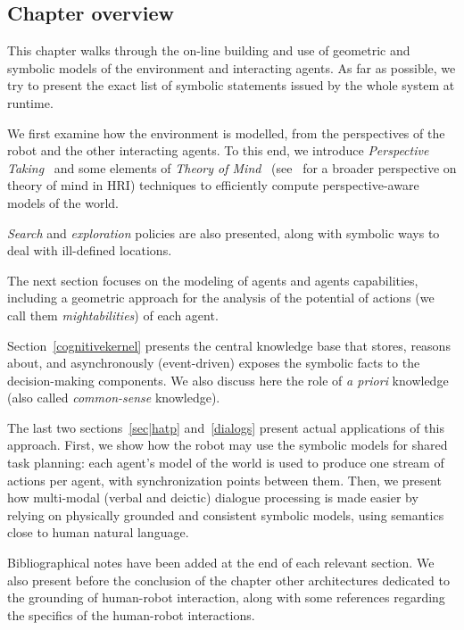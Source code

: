 \documentclass{svmult}
\begin{document}


\subsection{Chapter overview}

This chapter walks through the on-line building and use of geometric and
symbolic models of the environment and interacting agents. As far as possible,
we try to present the exact list of symbolic statements issued by the
whole system at runtime.

We first examine how the environment is modelled, from the perspectives of the
robot and the other interacting agents. To this end, we introduce
\emph{Perspective Taking}~\cite{Flavell1992,Tversky1999} and some elements of
\emph{Theory of Mind}~\cite{warnier2012when} (see~\cite{lemaignan2015mutual}
for a broader perspective on theory of mind in HRI) techniques to efficiently
compute perspective-aware models of the world. 

\emph{Search} and \emph{exploration} policies are also presented, along with
symbolic ways to deal with ill-defined locations.

The next section focuses on the modeling of agents and agents capabilities,
including a geometric approach for the analysis of the potential of actions (we
call them \emph{mightabilities}) of each agent.

Section~\ref{cognitivekernel} presents the central knowledge base that
stores, reasons about, and asynchronously (event-driven) exposes the symbolic
facts to the decision-making components. We also discuss here the role of {\it
a priori} knowledge (also called \emph{common-sense} knowledge).

The last two sections~\ref{sec|hatp} and~\ref{dialogs} present actual
applications of this approach. First, we show how the robot may use the
symbolic models for shared task planning: each agent's model of the world is
used to produce one stream of actions per agent, with synchronization points
between them. Then, we present how multi-modal (verbal and deictic) dialogue
processing is made easier by relying on physically grounded and consistent
symbolic models, using semantics close to human natural language.

Bibliographical notes have been added at the end of each relevant section.  We
also present before the conclusion of the chapter other architectures dedicated
to the grounding of human-robot interaction, along with some references
regarding the specifics of the human-robot interactions.
\end{document}
